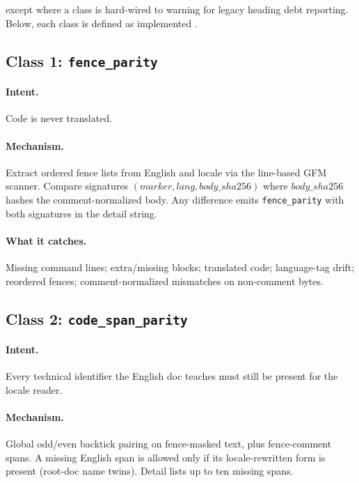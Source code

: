 \documentclass[11pt]{article}
\theoremstyle{definition}
\theoremstyle{plain}
\theoremstyle{remark}
\begin{document}
except where a class is hard-wired to warning for legacy heading debt
reporting. Below, each class is defined as implemented
\citep{hermespr80391}.

\subsection{Class 1: \texttt{fence\_parity}}

\paragraph{Intent.} Code is never translated.

\paragraph{Mechanism.} Extract ordered fence lists from English and locale
via the line-based GFM scanner. Compare signatures
$(\mathit{marker}, \mathit{lang}, \mathit{body\_sha256})$ where
$\mathit{body\_sha256}$ hashes the comment-normalized body. Any difference
emits \texttt{fence\_parity} with both signatures in the detail string.

\paragraph{What it catches.} Missing command lines; extra/missing blocks;
translated code; language-tag drift; reordered fences; comment-normalized
mismatches on non-comment bytes.

\subsection{Class 2: \texttt{code\_span\_parity}}

\paragraph{Intent.} Every technical identifier the English doc teaches must
still be present for the locale reader.

\paragraph{Mechanism.} Global odd/even backtick pairing on fence-masked text,
plus fence-comment spans. A missing English span is allowed only if its
locale-rewritten form is present (root-doc name twins). Detail lists up to
ten missing spans.
\end{document}
